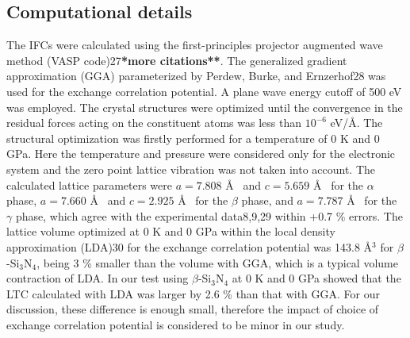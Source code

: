 \documentclass[twocolumn,amsmath,amssymb,a4paper,prb,superscriptaddress,floatfix]{revtex4-1}
\begin{document}
\subsection{Computational details}
The IFCs were calculated using the first-principles projector augmented
wave method (VASP code)27{\bf **more citations**}. The generalized
gradient approximation (GGA) parameterized by Perdew, Burke, and
Ernzerhof28 was used for the exchange correlation potential. A plane
wave energy cutoff of 500 eV was employed. The crystal structures were
optimized until the convergence in the residual forces acting on the
constituent atoms was less than $10^{-6}$ eV/\AA. The structural
optimization was firstly performed for a temperature of 0 K and 0
GPa. Here the temperature and pressure were considered only for the
electronic system and the zero point lattice vibration was not taken
into account. The calculated lattice parameters were $a=7.808$ \AA~ and
$c=5.659$ \AA~ for the $\alpha$ phase, $a=7.660$ \AA~ and $c=2.925$ \AA~%
for the $\beta$ phase, and $a=7.787$ \AA~ for the $\gamma$ phase, which
agree with the experimental data8,9,29 within +0.7 \% errors. The
lattice volume optimized at 0 K and 0 GPa within the local density
approximation (LDA)30 for the exchange correlation potential was 143.8
\AA$^3$ for $\beta$-Si$_3$N$_4$, being 3 \% smaller than the volume with
GGA, which is a typical volume contraction of LDA. In our test using
$\beta$-Si$_3$N$_4$ at 0 K and 0 GPa showed that the LTC calculated with
LDA was larger by 2.6 \% than that with GGA. For our discussion, these
difference is enough small, therefore the impact of choice of exchange
correlation potential is considered to be minor in our study.
\end{document}
